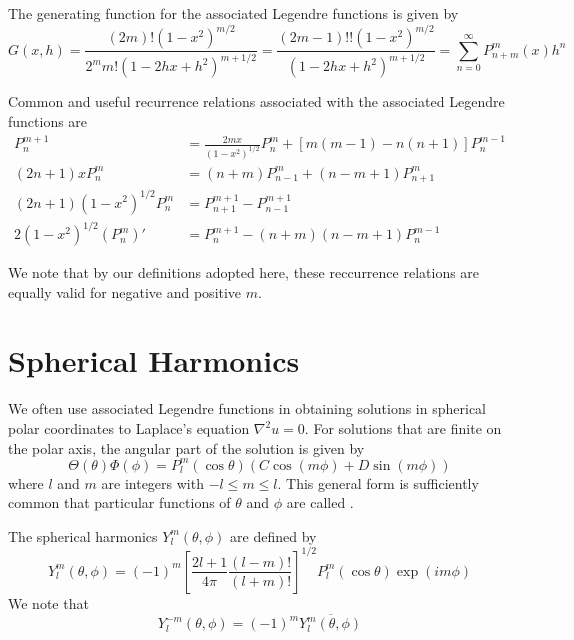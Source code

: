 \documentclass[12pt, a4paper, oneside, openright, titlepage]{book}
\begin{document}
\begin{defn}
    The generating function for the associated Legendre functions is given by \begin{equation}
        G(x,h) = \frac{(2m)!(1-x^2)^{m/2}}{2^mm!(1-2hx+h^2)^{m+1/2}} = \frac{(2m-1)!!(1-x^2)^{m/2}}{(1-2hx+h^2)^{m+1/2}} = \sum_{n=0}^{\infty}P_{n+m}^m(x)h^n
    \end{equation}
\end{defn}

Common and useful recurrence relations associated with the associated Legendre functions are \begin{align*}
    P_n^{m+1} &= \frac{2mx}{(1-x^2)^{1/2}}P_n^m+[m(m-1)-n(n+1)]P_n^{m-1} \\
    (2n+1)xP_n^m &= (n+m)P_{n-1}^m+(n-m+1)P_{n+1}^m \\
    (2n+1)(1-x^2)^{1/2}P_n^m &= P_{n+1}^{m+1} - P_{n-1}^{m+1} \\
    2(1-x^2)^{1/2}(P_n^m)' &= P_n^{m+1} - (n+m)(n-m+1)P_n^{m-1}
\end{align*}

We note that by our definitions adopted here, these reccurrence relations are equally valid for negative and positive $m$.


\chapter{Spherical Harmonics}


We often use associated Legendre functions in obtaining solutions in spherical polar coordinates to Laplace's equation $\nabla^2u = 0$. For solutions that are finite on the polar axis, the angular part of the solution is given by \begin{equation*}
    \Theta(\theta)\Phi(\phi) = P_l^m(\cos\theta)(C\cos(m\phi) + D\sin(m\phi)) 
\end{equation*}
where $l$ and $m$ are integers with $-l \leq m \leq l$. This general form is sufficiently common that particular functions of $\theta$ and $\phi$ are called . 

\begin{defn}
    The spherical harmonics $Y_l^m(\theta,\phi)$ are defined by \begin{equation*}
        Y_l^m(\theta,\phi) = (-1)^m\left[\frac{2l+1}{4\pi}\frac{(l-m)!}{(l+m)!}\right]^{1/2}P_l^m(\cos\theta)\exp(im\phi)
    \end{equation*}
    We note that \begin{equation*}
        Y_l^{-m}(\theta,\phi) = (-1)^m\overline{Y_l^m(\theta,\phi)}
    \end{equation*}
\end{defn}
\end{document}
